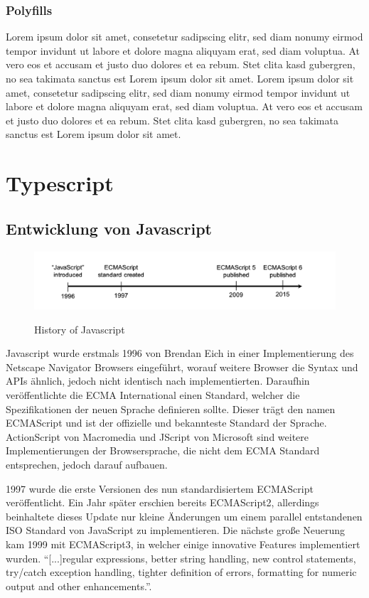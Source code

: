 \subsubsection{Polyfills}
Lorem ipsum dolor sit amet, consetetur sadipscing elitr, sed diam nonumy eirmod tempor invidunt ut labore et dolore magna aliquyam erat, sed diam voluptua. At vero eos et accusam et justo duo dolores et ea rebum. Stet clita kasd gubergren, no sea takimata sanctus est Lorem ipsum dolor sit amet. Lorem ipsum dolor sit amet, consetetur sadipscing elitr, sed diam nonumy eirmod tempor invidunt ut labore et dolore magna aliquyam erat, sed diam voluptua. At vero eos et accusam et justo duo dolores et ea rebum. Stet clita kasd gubergren, no sea takimata sanctus est Lorem ipsum dolor sit amet.


\section{Typescript}

\subsection{Entwicklung von Javascript}

\begin{figure}[ht]
 \centering
 \includegraphics[width=\linewidth]{kapitel2/javascript-timeline.png}
 \caption{History of Javascript}\cite[28]{EssentialTS}
\end{figure}

Javascript wurde erstmals 1996 von Brendan Eich in einer Implementierung des Netscape Navigator Browsers eingeführt,
worauf weitere Browser die Syntax und APIs ähnlich, jedoch nicht identisch nach implementierten.
Daraufhin veröffentlichte die ECMA International einen Standard, welcher die Spezifikationen der neuen Sprache
definieren sollte. Dieser trägt den namen ECMAScript und ist der offizielle und bekannteste Standard der
Sprache. ActionScript von Macromedia und JScript von Microsoft sind weitere Implementierungen der Browsersprache,
die nicht dem ECMA Standard entsprechen, jedoch darauf aufbauen.

1997 wurde die erste Versionen des nun standardisiertem ECMAScript veröffentlicht. Ein Jahr später erschien bereits ECMAScript2,
allerdings beinhaltete dieses Update nur kleine Änderungen um einem parallel entstandenen ISO Standard von JavaScript zu implementieren.
Die nächste große Neuerung kam 1999 mit ECMAScript3, in welcher einige innovative Features implementiert wurden.
``[...]regular expressions, better string handling, new control statements, try/catch exception handling, tighter definition of errors, formatting for numeric output and other enhancements.''\cite{js-vs-es}.

